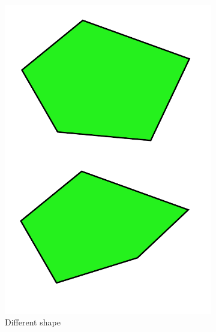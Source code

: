 \begin{figure}[h!]
\begin{subfigure}{.3\textwidth}
        \includegraphics[width=\textwidth]{images/fail_second_test.pdf}
        \caption{Different shape}
    \end{subfigure}
    \hfill
    \begin{subfigure}{.3\textwidth}
        \centering

\end{subfigure}
\end{figure}
